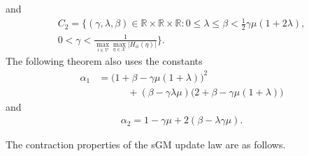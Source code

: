 \documentclass[9pt,shortpaper,twoside,web]{ieeecolor}
\newcommand{\R}{\ensuremath{\mathbb{R}}\xspace}
\newcommand{\X}{\ensuremath{\mathcal{X}}\xspace}
\newcommand{\V}{\ensuremath{\mathcal{V}}\xspace}
\begin{document}
    and
    \begin{multline}\label{eq:C2}
        C_2 = \bigg\{ (\gamma,\lambda,\beta)\in\R\times\R\times\R : 0\leq \lambda \leq \beta< \frac{1}{2}\gamma\mu(1+2\lambda), 
        \\ 0 <\gamma< \frac{1}{\max\limits_{i\in\V}\max\limits_{\eta\in\X}\vert H_{ii}(\eta)\vert}\Bigg\}.
    \end{multline}
The following theorem also 
uses the constants
\begin{align}\label{eq:a1}
    \alpha_1&= \big(1+\beta-\gamma\mu(1+\lambda)\big)^2 
    \\ &\quad\quad\quad + (\beta-\gamma\lambda \mu)\big(2+\beta-\gamma\mu(1+\lambda)\big)
\end{align}
and
\begin{align}\label{eq:a2}
        \alpha_2 = 1-\gamma\mu+2(\beta-\lambda\gamma\mu).
\end{align}

The contraction properties of the sGM update law are as follows. 
\end{document}
